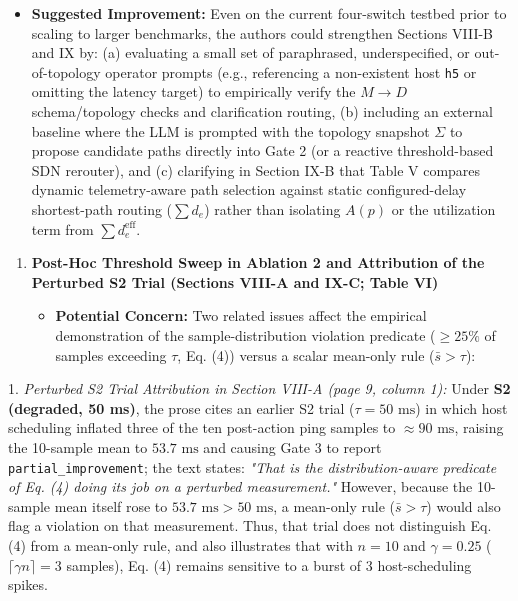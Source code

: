 \documentclass[11pt,a4paper]{article}
\begin{document}
\begin{itemize}[leftmargin=1.8em,itemsep=2pt]
\item \textbf{Suggested Improvement:} Even on the current four-switch testbed prior to scaling to larger benchmarks, the authors could strengthen Sections VIII-B and IX by: (a) evaluating a small set of paraphrased, underspecified, or out-of-topology operator prompts (e.g., referencing a non-existent host \texttt{h5} or omitting the latency target) to empirically verify the $M \to D$ schema/topology checks and clarification routing, (b) including an external baseline where the LLM is prompted with the topology snapshot $\Sigma$ to propose candidate paths directly into Gate 2 (or a reactive threshold-based SDN rerouter), and (c) clarifying in Section IX-B that Table V compares dynamic telemetry-aware path selection against static configured-delay shortest-path routing ($\sum d_e$) rather than isolating $A(p)$ or the utilization term from $\sum d_e^{\text{eff}}$.
\end{itemize}
\begin{enumerate}[leftmargin=1.6em,itemsep=3pt]
\item \textbf{Post-Hoc Threshold Sweep in Ablation 2 and Attribution of the Perturbed S2 Trial (Sections VIII-A and IX-C; Table VI)}
\begin{itemize}[leftmargin=1.8em,itemsep=2pt]
\item \textbf{Potential Concern:} Two related issues affect the empirical demonstration of the sample-distribution violation predicate ($\ge 25\%$ of samples exceeding $\tau$, Eq. (4)) versus a scalar mean-only rule ($\bar{s} > \tau$):
\end{itemize}
\end{enumerate}
1. \emph{Perturbed S2 Trial Attribution in Section VIII-A (page 9, column 1):} Under \textbf{S2 (degraded, 50 ms)}, the prose cites an earlier S2 trial ($\tau = 50\text{ ms}$) in which host scheduling inflated three of the ten post-action ping samples to $\approx 90\text{ ms}$, raising the 10-sample mean to $53.7\text{ ms}$ and causing Gate 3 to report \texttt{partial\_improvement}; the text states: \emph{"That is the distribution-aware predicate of Eq. (4) doing its job on a perturbed measurement."} However, because the 10-sample mean itself rose to $53.7\text{ ms} > 50\text{ ms}$, a mean-only rule ($\bar{s} > \tau$) would also flag a violation on that measurement. Thus, that trial does not distinguish Eq. (4) from a mean-only rule, and also illustrates that with $n = 10$ and $\gamma = 0.25$ ($\lceil \gamma n \rceil = 3$ samples), Eq. (4) remains sensitive to a burst of 3 host-scheduling spikes.
\end{document}
